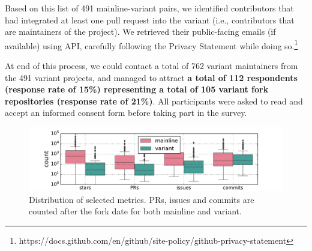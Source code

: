 Based on this list of 491 mainline-variant pairs, we identified contributors that had integrated at least one pull request into the variant (i.e., contributors that are maintainers of the project).
We retrieved their public-facing emails (if available) using \gh API, carefully following the \gh Privacy Statement while doing so.\footnote{https://docs.github.com/en/github/site-policy/github-privacy-statement}

At end of this process, we could contact a total of 762 variant maintainers from the 491 variant projects, and managed to attract \textbf{a total of 112 respondents (response rate of 15\%) representing a total of 105 variant fork repositories (response rate of 21\%)}.
All participants were asked to read and accept an informed consent form before taking part in the survey.


\begin{figure}[ht]
\begin{center}
    \centering
    \includegraphics[width=\columnwidth]{pdfs/stats.pdf}
    \caption{Distribution of selected metrics. PRs, issues and commits are counted after the fork date for both mainline and variant.}
    \label{fig:stats}
\end{center}
\vspace{-.3cm}
\end{figure}

